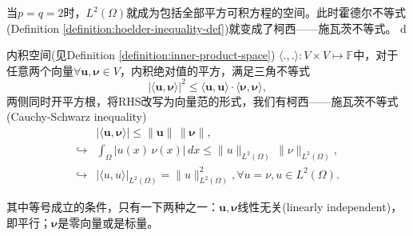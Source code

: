 当$p=q=2$时，$L^2(\Omega)$就成为包括全部平方可积方程的空间。此时霍德尔不等式(Definition \ref{definition:hoelder-inequality-def})就变成了柯西——施瓦茨不等式。 d
\begin{definition}[柯西——施瓦茨不等式]
  \label{definition:cauchy-schwarz-inequality}
  内积空间(见Definition \ref{definition:inner-product-space}) $\langle .,. \rangle : V \times V \mapsto \mathbb{F}$中，对于任意两个向量$\forall \bm{u}, \bm{\nu} \in V$，内积绝对值的平方，满足三角不等式
  \begin{equation*}
    \big| \langle \bm{u},\bm{\nu} \rangle \big|^2 \le \langle \bm{u},\bm{u} \rangle \cdot \langle \bm{\nu},\bm{\nu} \rangle,
  \end{equation*}
  两侧同时开平方根，将RHS改写为向量范的形式，我们有柯西——施瓦茨不等式(Cauchy-Schwarz inequality)
  \begin{equation*}
\begin{split}
      &\big| \langle \bm{u},\bm{\nu} \rangle \big| \le \| \bm{u} \| \, \| \bm{\nu} \|,\\
      \hookrightarrow & \int_{\Omega} \left| u(x) \, \nu(x) \right| \, d x \le \| u \|_{L^2(\Omega)} \, \| \nu \|_{L^2(\Omega)},\\
      \hookrightarrow & \big| \langle u, u \rangle \big|_{L^2(\Omega)} = \| u \|^2_{L^2(\Omega)}, \forall u=\nu, u \in L^2(\Omega).
\end{split}
  \end{equation*}

  其中等号成立的条件，只有一下两种之一：$\bm{u},\bm{\nu}$线性无关(linearly independent)，即平行；$\bm{\nu}$是零向量或是标量。
\end{definition}

